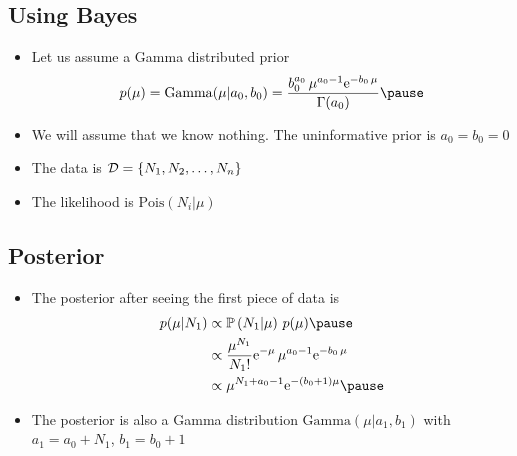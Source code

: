 
\begin{slide}
\section{Using Bayes}

\begin{PauseHighLight}
  \begin{itemize}
  \item Let us assume a Gamma distributed prior
    \begin{align*}
      p(\mu) = \mathrm{Gamma}(\mu|a_0,b_0) =
      \frac{b_0^{a_0}\, \mu^{a_0-1} \e{-b_0\,\mu}}{\Gamma(a_0)}\pause
    \end{align*}
  \item We will assume that we know nothing.  The uninformative prior is
    $a_0=b_0=0$\pause
  \item The data is $\mathcal{D}=\{N_1, N_2, \ldots, N_n\}$\pause
  \item The likelihood is $\mathrm{Pois}(N_i|\mu)$\pause
  \end{itemize}
\end{PauseHighLight}

\end{slide}


\begin{slide}
\section{Posterior}

\begin{PauseHighLight}
  \begin{itemize}
  \item The posterior after seeing the first piece of data is
    \begin{align*}
      p(\mu|N_1) &\propto \Prob{N_1|\mu}\, p(\mu) \pause
      \\
      &\propto \frac{\mu^{N_1}}{N_1!} \e{-\mu} \, \mu^{a_0-1} \e{-b_0\,\mu}
      \\
      &\propto \mu^{N_1+a_0-1} \e{-(b_0+1)\mu}\pause
    \end{align*}
  \item The posterior is also a Gamma distribution
    $\mathrm{Gamma}(\mu|a_1,b_1)$ with $a_1=a_0+N_1$, $b_1=b_0+1$\pause
  \end{itemize}
\end{PauseHighLight}

\end{slide}

